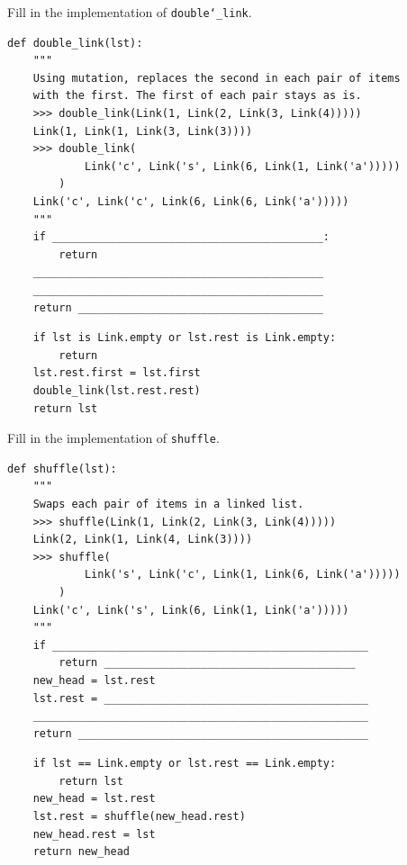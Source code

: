 \documentclass{exam}
\begin{document}
\begin{questions}
\begin{blocksection}
\question Fill in the implementation of \texttt{double\char`_link}.

\begin{lstlisting}
def double_link(lst):
    """
    Using mutation, replaces the second in each pair of items
    with the first. The first of each pair stays as is.
    >>> double_link(Link(1, Link(2, Link(3, Link(4)))))
    Link(1, Link(1, Link(3, Link(3))))
    >>> double_link(
            Link('c', Link('s', Link(6, Link(1, Link('a')))))
        )
    Link('c', Link('c', Link(6, Link(6, Link('a')))))
    """
    if __________________________________________:
        return
    _____________________________________________
    _____________________________________________
    return ______________________________________
\end{lstlisting}
\begin{solution}[0.5in]
\begin{lstlisting}
    if lst is Link.empty or lst.rest is Link.empty:
        return
    lst.rest.first = lst.first
    double_link(lst.rest.rest)
    return lst
\end{lstlisting}
\end{solution}
\end{blocksection}

\begin{blocksection}
\question Fill in the implementation of \texttt{shuffle}.

\begin{lstlisting}
def shuffle(lst):
    """
    Swaps each pair of items in a linked list.
    >>> shuffle(Link(1, Link(2, Link(3, Link(4)))))
    Link(2, Link(1, Link(4, Link(3))))
    >>> shuffle(
            Link('s', Link('c', Link(1, Link(6, Link('a')))))
        )
    Link('c', Link('s', Link(6, Link(1, Link('a')))))
    """
    if _________________________________________________
        return _______________________________________
    new_head = lst.rest
    lst.rest = _________________________________________
    ____________________________________________________
    return _____________________________________________
\end{lstlisting}

\begin{solution}[0.5in]
\begin{lstlisting}
    if lst == Link.empty or lst.rest == Link.empty:
        return lst
    new_head = lst.rest
    lst.rest = shuffle(new_head.rest)
    new_head.rest = lst
    return new_head
\end{lstlisting}
\end{solution}
\end{blocksection}


\end{questions}
\end{document}
